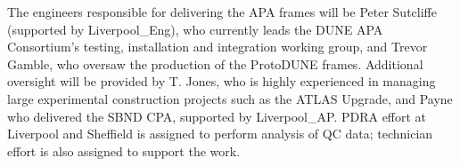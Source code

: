 \begin{figure}
\begin{floatrow}
\end{floatrow}
\end{figure}

The engineers responsible for delivering the APA frames will be Peter Sutcliffe (supported by Liverpool\_Eng),  who currently leads the DUNE APA Consortium's testing, installation and integration working group, and Trevor Gamble, who oversaw the production of the ProtoDUNE frames. Additional oversight will be provided by T. Jones, who is highly experienced in managing large experimental construction projects such as the ATLAS Upgrade, and Payne who delivered the SBND CPA, supported by Liverpool\_AP. PDRA effort at Liverpool and Sheffield is assigned to perform analysis of QC data; technician effort is also assigned to support the work.




